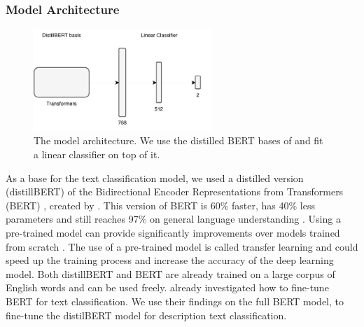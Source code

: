 \documentclass[a4paper, 12pt, oneside]{book} %
\begin{document}
\subsubsection{Model Architecture} \label{par:Architecture}


\begin{figure} [htpb]
    \centering
    \includegraphics[width=0.6\textwidth]{figures/architectureDL.pdf}
    \caption[Model Architecture]{The model architecture. We use the distilled BERT bases of \textcite{sanh_distilbert_2020} and fit a linear classifier on top of it.}
    \label{fig:model_architecture}
\end{figure}

As a base for the text classification model, we used a distilled version (distillBERT) of the Bidirectional Encoder Representations from Transformers (BERT) \autocite{devlin_bert_2019}, created by \textcite{sanh_distilbert_2020}. 
This version of BERT is 60\% faster, has 40\% less parameters and still reaches 97\% on general language understanding \autocite{sanh_distilbert_2020}.
Using a pre-trained model can provide significantly improvements over models trained from scratch \autocite{mikolov_distributed_2013}.
The use of a pre-trained model is called transfer learning and could speed up the training process and increase the accuracy of the deep learning model.
Both distillBERT and BERT are already trained on a large corpus of English words and can be used freely.
\textcite{sun_how_2020} already investigated how to fine-tune BERT for text classification.
We use their findings on the full BERT model, to fine-tune the distilBERT model for description text classification.
\end{document}
